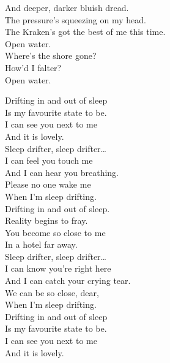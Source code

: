And deeper, darker bluish dread. \\
The pressure's squeezing on my head. \\
The Kraken's got the best of me this time. \\

Open water. \\
Where's the shore gone? \\
How'd I falter? \\
Open water. \\





Drifting in and out of sleep \\
Is my favourite state to be. \\
I can see you next to me \\
And it is lovely. \\

Sleep drifter, sleep drifter… \\

I can feel you touch me \\
And I can hear you breathing. \\
Please no one wake me \\
When I'm sleep drifting. \\

Drifting in and out of sleep. \\
Reality begins to fray. \\
You become so close to me \\
In a hotel far away. \\

Sleep drifter, sleep drifter… \\

I can know you're right here \\
And I can catch your crying tear. \\
We can be so close, dear, \\
When I'm sleep drifting. \\

Drifting in and out of sleep \\
Is my favourite state to be. \\
I can see you next to me \\
And it is lovely. \\

